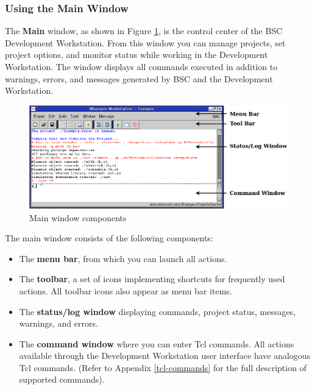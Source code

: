 \documentclass{article}
\newcommand{\te}[1]{\texttt{#1}}
\begin{document}


\subsubsection{Using the Main Window}

The {\bf Main} window, as shown in Figure \ref{fig-main},
is the control center of the BSC Development Workstation.
From this window you can manage projects, set project
options, and monitor status while working in the Development
Workstation. The window displays all commands executed in addition to
warnings, errors, and messages generated by BSC
and the Development Workstation.

\begin{figure}[ht]
\begin{center}
\includegraphics[width = 6 in]{figures/mainwindow}
\caption{Main window components}
\label{fig-main}
\end{center}
\end{figure}

The main window consists of the following components:
\begin{itemize}
\item The {\bf menu bar}, from which you can launch  all actions.
\item The {\bf toolbar},  a set of icons implementing shortcuts for
frequently used actions.  All toolbar icons  also appear as menu bar items.
\item The {\bf status/log window} displaying commands, project status,
messages, warnings, and errors.
\item The {\bf command window} where you can enter  Tcl
commands.  All
actions available through the Development Workstation user interface have analogous
Tcl commands. (Refer to Appendix \ref{tcl-commands} for the full description of supported
commands).
\end{itemize}
\end{document}
